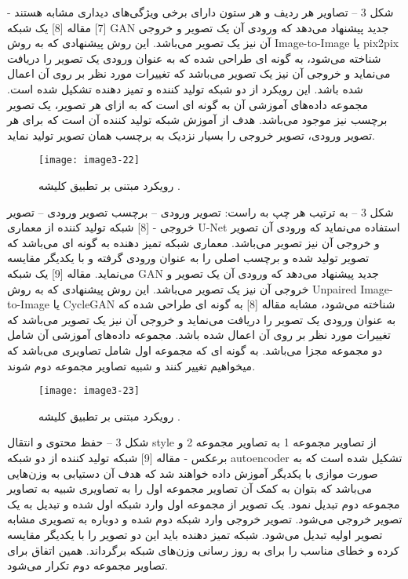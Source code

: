 شکل ‏3 – تصاویر هر ردیف و هر ستون دارای برخی ویژگی‌های دیداری مشابه هستند - [7]
مقاله [8] یک شبکه GAN جدید پیشنهاد می‌دهد که ورودی آن یک تصویر و خروجی آن نیز یک تصویر می‌باشد. این روش پیشنهادی که به روش Image-to-Image یا pix2pix شناخته می‌شود، به گونه ای طراحی شده که به عنوان ورودی یک تصویر را دریافت می‌نماید و خروجی آن نیز یک تصویر می‌باشد که تغییرات مورد نظر بر روی آن اعمال شده باشد. این رویکرد از دو شبکه تولید کننده و تمیز دهنده تشکیل شده است. مجموعه داده‌های آموزشی آن به گونه ای است که به ازای هر تصویر، یک تصویر برچسب نیز موجود می‌باشد. هدف از آموزش شبکه تولید کننده آن است که برای هر تصویر ورودی، تصویر خروجی را بسیار نزدیک به برچسب همان تصویر تولید نماید.
     
  \begin{figure}[h]
\centering
  \texttt{[image: image3-22]}
  \caption{رویکرد مبتنی بر تطبیق کلیشه  \cite{ref1}.}
  \label{image3-22}
\end{figure}
شکل ‏3 – به ترتیب هر چپ به راست: تصویر ورودی – برچسب تصویر ورودی – تصویر خروجی - [8]
شبکه تولید کننده از معماری U-Net استفاده می‌نماید که ورودی آن تصویر و خروجی آن نیز تصویر می‌باشد. معماری شبکه تمیز دهنده به گونه ای می‌باشد که تصویر تولید شده و برچسب اصلی را به عنوان ورودی گرفته و با یکدیگر مقایسه می‌نماید. 
مقاله [9] یک شبکه GAN جدید پیشنهاد می‌دهد که ورودی آن یک تصویر و خروجی آن نیز یک تصویر می‌باشد. این روش پیشنهادی که به روش Unpaired Image-to-Image یا CycleGAN شناخته می‌شود، مشابه مقاله [8] به گونه ای طراحی شده که به عنوان ورودی یک تصویر را دریافت می‌نماید و خروجی آن نیز یک تصویر می‌باشد که تغییرات مورد نظر بر روی آن اعمال شده باشد. مجموعه داده‌های آموزشی آن شامل دو مجموعه مجزا می‌باشد. به گونه ای که مجموعه اول شامل تصاویری می‌باشد که میخواهیم تغییر کنند و شبیه تصاویر مجموعه دوم شوند. 
 
  \begin{figure}[h]
\centering
  \texttt{[image: image3-23]}
  \caption{رویکرد مبتنی بر تطبیق کلیشه  \cite{ref1}.}
  \label{image3-23}
\end{figure}
شکل ‏3 – حفظ محتوی و انتقال style از تصاویر مجموعه 1 به تصاویر مجموعه 2 و برعکس - مقاله [9]
شبکه تولید کننده از دو شبکه autoencoder تشکیل شده است که به صورت موازی با یکدیگر آموزش داده خواهند شد که هدف آن‌ دستیابی به وزن‌هایی می‌باشد که بتوان به کمک آن تصاویر مجموعه اول را به تصاویری شبیه به تصاویر مجموعه دوم تبدیل نمود. یک تصویر از مجموعه اول وارد شبکه اول شده و تبدیل به یک تصویر خروجی می‌شود. تصویر خروجی وارد شبکه دوم شده و دوباره به تصویری مشابه تصویر اولیه تبدیل می‌شود. شبکه تمیز دهنده باید این دو تصویر را با یکدیگر مقایسه کرده و خطای مناسب را برای به روز رسانی وزن‌های شبکه برگرداند. همین اتفاق برای تصاویر مجموعه دوم تکرار می‌شود.

